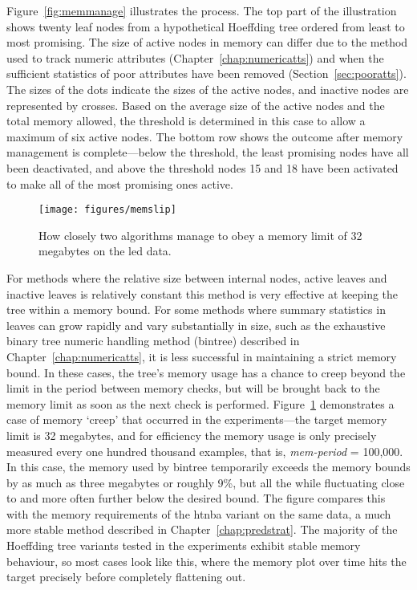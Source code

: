 Figure~\ref{fig:memmanage} illustrates the process. The top part of the illustration shows twenty leaf nodes from a hypothetical Hoeffding tree ordered from least to most promising. The size of active nodes in memory can differ due to the method used to track numeric attributes (Chapter~\ref{chap:numericatts}) and when the sufficient statistics of poor attributes have been removed (Section~\ref{sec:pooratts}). The sizes of the dots indicate the sizes of the active nodes, and inactive nodes are represented by crosses. Based on the average size of the active nodes and the total memory allowed, the threshold is determined in this case to allow a maximum of six active nodes. The bottom row shows the outcome after memory management is complete---below the threshold, the least promising nodes have all been deactivated, and above the threshold nodes 15 and 18 have been activated to make all of the most promising ones active.

\begin{figure}
\texttt{[image: figures/memslip]}
\caption{How closely two algorithms manage to obey a memory limit of 32 megabytes on the {\sc led} data.}
\label{fig:memslip}
\end{figure}

For methods where the relative size between internal nodes, active leaves and inactive leaves is relatively constant this method is very effective at keeping the tree within a memory bound. For some methods where summary statistics in leaves can grow rapidly and vary substantially in size, such as the exhaustive binary tree numeric handling method ({\sc bintree}) described in Chapter~\ref{chap:numericatts}, it is less successful in maintaining a strict memory bound. In these cases, the tree's memory usage has a chance to creep beyond the limit in the period between memory checks, but will be brought back to the memory limit as soon as the next check is performed. Figure~\ref{fig:memslip} demonstrates a case of memory `creep' that occurred in the experiments---the target memory limit is 32 megabytes, and for efficiency the memory usage is only precisely measured every one hundred thousand examples, that is, {\em mem-period} = 100,000. In this case, the memory used by {\sc bintree} temporarily exceeds the memory bounds by as much as three megabytes or roughly 9\%, but all the while fluctuating close to and more often further below the desired bound. The figure compares this with the memory requirements of the {\sc htnba} variant on the same data, a much more stable method described in Chapter~\ref{chap:predstrat}. The majority of the Hoeffding tree variants tested in the experiments exhibit stable memory behaviour, so most cases look like this, where the memory plot over time hits the target precisely before completely flattening out.

